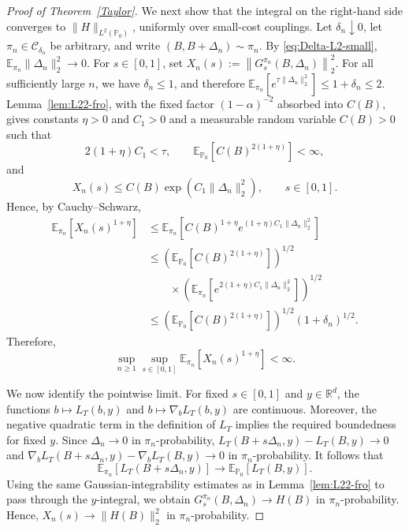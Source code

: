 \documentclass[11pt]{article}
\theoremstyle{definition}
\newcommand{\E}{\mathbb{E}}
\begin{document}
\begin{proof}[Proof of Theorem~\ref{Taylor}]
We next show that the integral on the right-hand side converges to
$\|H\|_{L^2(\mathbb P_0)}$, uniformly over small-cost couplings. Let
$\delta_n\downarrow0$, let $\pi_n\in\mathcal C_{\delta_n}$ be arbitrary,
and write $(B,B+\Delta_n)\sim\pi_n.$
By \eqref{eq:Delta-L2-small}, $\E_{\pi_n}\|\Delta_n\|_2^2\longrightarrow0.$
For $s\in[0,1]$, set $X_n(s)
:=
\left\|
G_s^{\pi_n}(B,\Delta_n)
\right\|_2^2.$
For all sufficiently large $n$, we have $\delta_n\le1$, and therefore $\E_{\pi_n}
\left[
e^{\tau\|\Delta_n\|_2^2}
\right]
\le
1+\delta_n
\le2.$
Lemma~\ref{lem:L22-fro}, with the fixed factor
$(1-\alpha)^{-2}$ absorbed into $C(B)$, gives constants
$\eta>0$ and $C_1>0$ and a measurable random variable $C(B)>0$
such that
\[
2(1+\eta)C_1<\tau,
\qquad
\E_{\mathbb P_0}
\left[
C(B)^{2(1+\eta)}
\right]
<\infty,
\]
and
\[
X_n(s)
\le
C(B)
\exp\!\left(
C_1\|\Delta_n\|_2^2
\right),
\qquad
s\in[0,1].
\]
Hence, by Cauchy--Schwarz,
\begin{align*}
\E_{\pi_n}
\left[
X_n(s)^{1+\eta}
\right]
&\le
\E_{\pi_n}
\left[
C(B)^{1+\eta}
e^{(1+\eta)C_1\|\Delta_n\|_2^2}
\right]
\\
&\le
\left(
\E_{\mathbb P_0}
\left[
C(B)^{2(1+\eta)}
\right]
\right)^{1/2}
\\
&\qquad\times
\left(
\E_{\pi_n}
\left[
e^{2(1+\eta)C_1\|\Delta_n\|_2^2}
\right]
\right)^{1/2}
\\
&\le
\left(
\E_{\mathbb P_0}
\left[
C(B)^{2(1+\eta)}
\right]
\right)^{1/2}
(1+\delta_n)^{1/2}.
\end{align*}
Therefore,
\begin{equation}\label{eq:X-uniform-moment}
\sup_{n\ge1}\sup_{s\in[0,1]}
\E_{\pi_n}
\left[
X_n(s)^{1+\eta}
\right]
<\infty.
\end{equation}

We now identify the pointwise limit. For fixed $s\in[0,1]$ and
$y\in\mathbb R^d$, the functions $b\longmapsto L_T(b,y)$ and $b\longmapsto\nabla_bL_T(b,y)$
are continuous. Moreover, the negative quadratic term in the
definition of $L_T$ implies the required boundedness for fixed $y$.
Since $\Delta_n\to0$ in $\pi_n$-probability, $L_T(B+s\Delta_n,y)-L_T(B,y)
\longrightarrow0$
and $\nabla_bL_T(B+s\Delta_n,y)
-
\nabla_bL_T(B,y)
\longrightarrow0$
in $\pi_n$-probability. It follows that
\[
\E_{\pi_n}
\left[
L_T(B+s\Delta_n,y)
\right]
\longrightarrow
\E_{\mathbb P_0}
\left[
L_T(B,y)
\right].
\]
Using the same Gaussian-integrability estimates as in
Lemma~\ref{lem:L22-fro} to pass through the $y$-integral, we obtain $G_s^{\pi_n}(B,\Delta_n)
\longrightarrow
H(B)$
in $\pi_n$-probability. Hence, $X_n(s)
\longrightarrow
\|H(B)\|_2^2$
in $\pi_n$-probability.


\end{proof}
\end{document}
